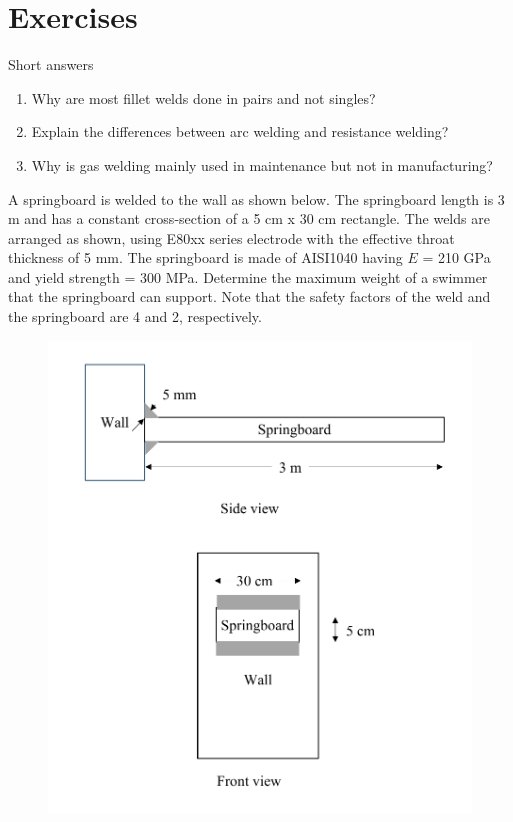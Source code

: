 \documentclass[
10pt,
a4paper,
openany,
svgnames,
]{book}
\newcommand{\exercise}{%
\item \label{lab:\arabic{chapter}-\arabic{exercisesi}}  %
}
\begin{document}
\section*{Exercises}

\begin{exercises}
  \exercise Short answers
  \begin{enumerate}
  \item Why are most fillet welds done in pairs and not singles?
  \item Explain the differences between arc welding and resistance welding?
  \item Why is gas welding mainly used in maintenance but not in manufacturing?
  \end{enumerate}
  \exercise A springboard is welded to the wall as shown below. The springboard length is 3 m and has a constant cross-section of a 5 cm x 30 cm rectangle. The welds are arranged as shown, using E80xx series electrode with the effective throat thickness of 5 mm. The springboard is made of AISI1040 having $E$ = 210 GPa and yield strength = 300 MPa. Determine the maximum weight of a swimmer that the springboard can support. Note that the safety factors of the weld and the springboard are 4 and 2, respectively.
  \begin{figure}[H]
    \centering
    \includegraphics[scale=0.7]{pictures/Welding/springboard-exercise}

\end{figure}
\end{exercises}
\end{document}
